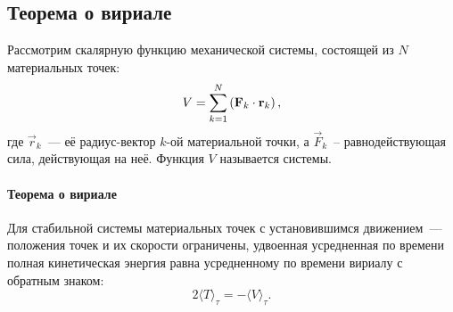 \subsection{Теорема о вириале}
Рассмотрим скалярную функцию механической системы, состоящей из $N$ материальных точек:
\begin{equation}
    V = \sum_{k=1}^N \left(\mathbf{F}_k \cdot \mathbf{r}_k \right),
    \label{eq:virial-def}
\end{equation}
где $\vec r_k$~--- её радиус-вектор $k$-ой материальной точки, а $\vec F_k$~-- равнодействующая сила, действующая на неё. Функция $V$ называется  системы.

\paragraph{Теорема о вириале} Для стабильной системы материальных точек с установившимся движением~--- положения точек и их скорости ограничены, удвоенная усредненная по времени полная кинетическая энергия равна усредненному по времени вириалу с обратным знаком:
\begin{equation}
    2 \langle T \rangle_\tau = - \langle V \rangle_\tau.
\end{equation}

